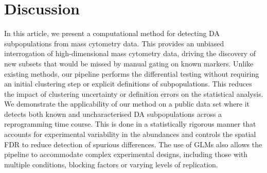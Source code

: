\documentclass{article}
\begin{document}
\section{Discussion}
In this article, we present a computational method for detecting DA subpopulations from mass cytometry data.
This provides an unbiased interrogation of high-dimensional mass cytometry data, driving the discovery of new subsets that would be missed by manual gating on known markers.
Unlike existing methods, our pipeline performs the differential testing without requiring an initial clustering step or explicit definitions of subpopulations.
This reduces the impact of clustering uncertainty or definition errors on the statistical analysis.
We demonstrate the applicability of our method on a public data set where it detects both known and uncharacterised DA subpopulations across a reprogramming time course.
This is done in a statistically rigorous manner that accounts for experimental variability in the abundances and controls the spatial FDR to reduce detection of spurious differences.
The use of GLMs also allows the pipeline to accommodate complex experimental designs, including those with multiple conditions, blocking factors or varying levels of replication.


\end{document}
